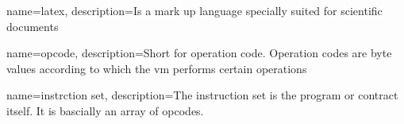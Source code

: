 \makeglossaries

{
        name=latex,
        description={Is a mark up language specially suited for
scientific documents}
}


{
        name=opcode,
        description={Short for operation code. Operation codes are byte values according to which the vm performs certain operations}
}

{
        name=instrction set,
        description={The instruction set is the program or contract itself. It is bascially an array of opcodes.}
}
